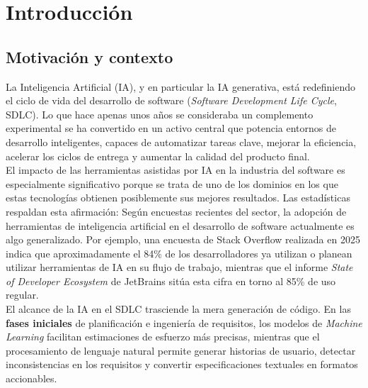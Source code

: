 
\cleardoublepage
\chapter{Introducción} \label{chap:Introduccion}

\section{Motivación y contexto} \label{sec:motivacion}

La Inteligencia Artificial (\ac{IA}), y en particular la \ac{IA} generativa, está redefiniendo el ciclo de vida del desarrollo de software (\textit{Software Development Life Cycle}, SDLC). Lo que hace apenas unos años se consideraba un complemento experimental se ha convertido en un activo central que potencia entornos de desarrollo inteligentes, capaces de automatizar tareas clave, mejorar la eficiencia, acelerar los ciclos de entrega y aumentar la calidad del producto final.\\

El impacto de las herramientas asistidas por \ac{IA} en la industria del software es especialmente significativo porque se trata de uno de los dominios en los que estas tecnologías obtienen posiblemente sus mejores resultados. Las estadísticas respaldan esta afirmación: Según encuestas recientes del sector, la adopción de herramientas de inteligencia artificial en el desarrollo de software actualmente es algo generalizado. Por ejemplo, una encuesta de Stack Overflow \cite{StackOverflow:2025} realizada en 2025 indica que aproximadamente el 84\% de los desarrolladores ya utilizan o planean utilizar herramientas de \ac{IA} en su flujo de trabajo, mientras que el informe \textit{State of Developer Ecosystem} de JetBrains \cite{JetBrains:2025} sitúa esta cifra en torno al 85\% de uso regular.\\

El alcance de la \ac{IA} en el SDLC trasciende la mera generación de código. En las \textbf{fases iniciales} de planificación e ingeniería de requisitos, los modelos de \textit{Machine Learning} facilitan estimaciones de esfuerzo más precisas, mientras que el procesamiento de lenguaje natural permite generar historias de usuario, detectar inconsistencias en los requisitos y convertir especificaciones textuales en formatos accionables.\\

